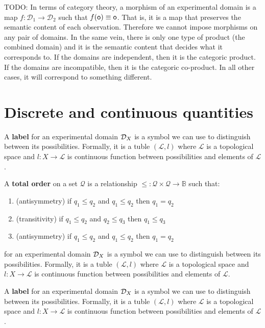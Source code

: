 \documentclass[11pt,letterpaper,fleqn]{memoir} %
\begin{document}
TODO: In terms of category theory, a morphism of an experimental domain is a map $f : \mathcal{D}_1 \to \mathcal{D}_2$ such that $f(\mathsf{o}) \equiv \mathsf{o}$. That is, it is a map that preserves the semantic content of each observation. Therefore we cannot impose morphisms on any pair of domains. In the same vein, there is only one type of product (the combined domain) and it is the semantic content that decides what it corresponds to. If the domains are independent, then it is the categoric product. If the domains are incompatible, then it is the categoric co-product. In all other cases, it will correspond to something different.

\section{Discrete and continuous quantities}

\begin{mathSection}
	
	\begin{defn}
		A \textbf{label} for an experimental domain $\mathcal{D}_X$ is a symbol we can use to distinguish between its possibilities. Formally, it is a tuble $(\mathcal{L}, l)$ where $\mathcal{L}$ is a topological space and $l : X \to \mathcal{L}$ is continuous function  between possibilities and elements of $\mathcal{L}$.
	\end{defn}
	
	\begin{defn}
		A \textbf{total order} on a set $\mathcal{Q}$ is a relationship $\leq : \mathcal{Q} \times \mathcal{Q} \to \mathbb{B}$ such that:
		\begin{enumerate}
			\item (antisymmetry) if $q_1 \leq q_2$ and $q_1 \leq q_2$ then $q_1 = q_2$
			\item (transitivity) if $q_1 \leq q_2$ and $q_2 \leq q_3$ then $q_1 \leq q_3$
			\item (antisymmetry) if $q_1 \leq q_2$ and $q_1 \leq q_2$ then $q_1 = q_2$
		\end{enumerate}
		
		 for an experimental domain $\mathcal{D}_X$ is a symbol we can use to distinguish between its possibilities. Formally, it is a tuble $(\mathcal{L}, l)$ where $\mathcal{L}$ is a topological space and $l : X \to \mathcal{L}$ is continuous function  between possibilities and elements of $\mathcal{L}$.
	\end{defn}
	
	\begin{defn}
		A \textbf{label} for an experimental domain $\mathcal{D}_X$ is a symbol we can use to distinguish between its possibilities. Formally, it is a tuble $(\mathcal{L}, l)$ where $\mathcal{L}$ is a topological space and $l : X \to \mathcal{L}$ is continuous function  between possibilities and elements of $\mathcal{L}$.
	\end{defn}

\end{mathSection}
\end{document}
